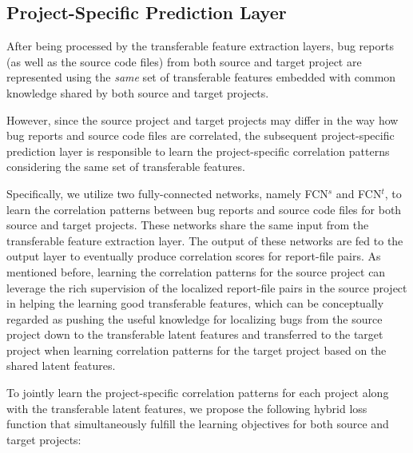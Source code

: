 
\subsection{Project-Specific Prediction Layer} %

After being processed by the transferable feature extraction layers, bug reports (as well as the source code files) from both source and target project are represented using the \emph{same} set of transferable features embedded with common knowledge shared by both source and target projects.


However, since the source project and target projects may differ in the way how bug reports and source code files are correlated, the subsequent project-specific prediction layer is responsible to learn the project-specific correlation patterns considering the same set of transferable features.

Specifically, we utilize two fully-connected networks, namely FCN$^s$ and FCN$^t$, to learn the correlation patterns between bug reports and source code files for both source and target projects. These networks share the same input from the transferable feature extraction layer. The output of these networks are fed to the output layer to eventually produce correlation scores for report-file pairs. As mentioned before, learning the correlation patterns for the source project can leverage the rich supervision of the localized report-file pairs in the source project in helping the learning good transferable features, which can be conceptually regarded as pushing the useful knowledge for localizing bugs from the source project down to the transferable latent features and transferred to the target project when learning correlation patterns for the target project based on the shared latent features. 


To jointly learn the project-specific correlation patterns for each project along with the transferable latent features, we propose the following hybrid loss function that simultaneously fulfill the learning objectives for both source and target projects: 

